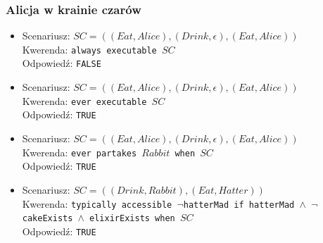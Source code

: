 \documentclass{article}
\begin{document}
\subsubsection{Alicja w krainie czarów}
\begin{itemize}
\item
Scenariusz: $SC=((Eat,Alice),(Drink,\epsilon),(Eat,Alice))$\\
Kwerenda: {\large\texttt{always executable $SC$}}\\
Odpowiedź: \texttt{FALSE}
\item
Scenariusz: $SC=((Eat,Alice),(Drink,\epsilon),(Eat,Alice))$\\
Kwerenda: {\large\texttt{ever executable $SC$}}\\
Odpowiedź: \texttt{TRUE}
\item
Scenariusz: $SC=((Eat,Alice),(Drink,\epsilon),(Eat,Alice))$\\
Kwerenda: {\large\texttt{ever partakes $Rabbit$ when $SC$}}\\
Odpowiedź: \texttt{TRUE}
\item
Scenariusz: $SC=((Drink,Rabbit),(Eat,Hatter))$\\
Kwerenda: {\large\texttt{typically accessible $\neg$hatterMad if hatterMad $\wedge$ $\neg$cakeExists $\wedge$ elixirExists when $SC$}}\\
Odpowiedź: \texttt{TRUE}
\end{itemize}
\end{document}
